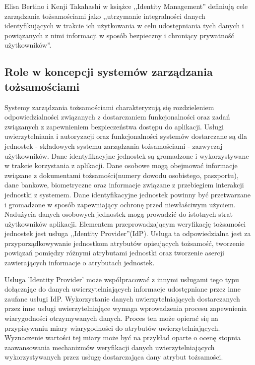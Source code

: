 	Elisa Bertino i Kenji Takahashi w książce ,,Identity Management'' definiują cele zarządzania tożsamościami jako ,,utrzymanie integralności danych identyfikujących w trakcie ich użytkowania w celu udostępniania tych danych i powiązanych z nimi informacji w sposób bezpieczny i chroniący prywatność użytkowników''\cite{Bertino11}.
	 
	\subsection{Role w koncepcji systemów zarządzania tożsamościami}

		Systemy zarządzania tożsamościami charakteryzują się rozdzieleniem odpowiedzialności związanych z dostarczaniem funkcjonalności oraz zadań związanych z zapewnieniem bezpieczeństwa dostępu do aplikacji. Usługi uwierzytelniania i autoryzacji oraz funkcjonalności systemów dostarczane są dla jednostek - składowych systemu zarządzania tożsamościami - zazwyczaj użytkowników.
		Dane identyfikacyjne jednostek są gromadzone i wykorzystywane w trakcie korzystania z aplikacji. Dane osobowe mogą obejmować informacje związane z dokumentami tożsamości(numery dowodu osobistego, paszportu), dane bankowe, biometryczne oraz informacje związane z przebiegiem interakcji jednostki z systemem. Dane identyfikacyjne jednostek powinny być przetwarzane i gromadzone w sposób zapewniający  ochronę przed niewłaściwym użyciem. Nadużycia danych osobowych jednostek mogą prowadzić do istotnych strat użytkowników aplikacji.
		Elementem przeprowadzającym weryfikację tożsamości jednostek jest usługa ,,Identity Provider''(IdP). Usługa ta odpowiedzialna jest za przyporządkowywanie jednostkom atrybutów opisujących tożsamość, tworzenie powiązań pomiędzy różnymi atrybutami jednostki oraz tworzenie asercji zawierających informacje o atrybutach jednostek. 

		Usługa 'Identity Provider' może współpracować z innymi usługami tego typu dołączając do danych uwierzytelniających informacje udostępniane przez inne zaufane usługi IdP. Wykorzystanie danych uwierzytelniających dostarczanych przez inne usługi uwierzytelniające wymaga wprowadzenia procesu zapewnienia wiarygodności otrzymywanych danych. Proces ten może opierać się na przypisywaniu miary wiarygodności do atrybutów uwierzytelniających. Wyznaczenie wartości tej miary może być na przykład oparte o ocenę stopnia zaawansowania mechanizmów weryfikacji danych uwierzytelniających wykorzystywanych przez usługę dostarczająca dany atrybut tożsamości.


